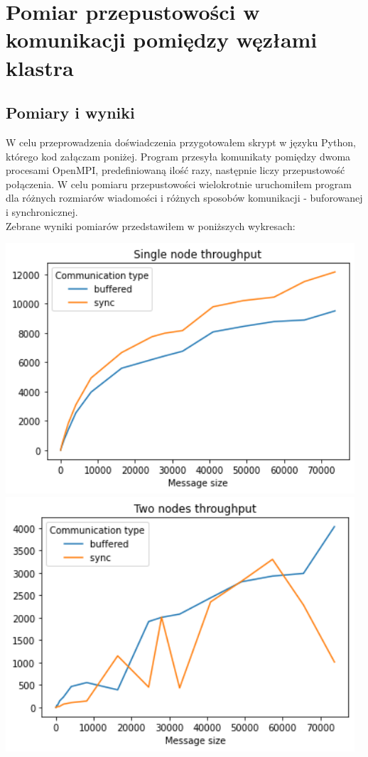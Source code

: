 \documentclass{article}
\begin{document}
    \section{Pomiar przepustowości w komunikacji pomiędzy węzłami klastra}
        \subsection{Pomiary i wyniki}
        W celu przeprowadzenia doświadczenia przygotowałem skrypt w języku Python, którego kod załączam poniżej. Program przesyła komunikaty pomiędzy dwoma procesami OpenMPI, predefiniowaną ilość razy, następnie liczy przepustowość połączenia. W celu pomiaru przepustowości wielokrotnie uruchomiłem program dla różnych rozmiarów wiadomości i różnych sposobów komunikacji - buforowanej i synchronicznej. \\
        Zebrane wyniki pomiarów przedstawiłem w poniższych wykresach:
        \begin{center}
            \includegraphics[width=13cm]{report1/images/ex1_single_node.png}
            \includegraphics[width=13cm]{report1/images/ex1_two_nodes.png}
        \end{center}
\end{document}
